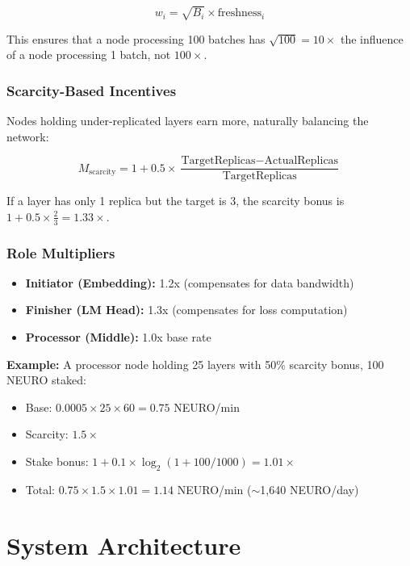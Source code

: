 \documentclass[11pt,a4paper]{article}
\begin{document}
\begin{equation}
w_i = \sqrt{B_i} \times \text{freshness}_i
\end{equation}

This ensures that a node processing 100 batches has $\sqrt{100} = 10\times$ the influence of a node processing 1 batch, not $100\times$.

\subsubsection{Scarcity-Based Incentives}
Nodes holding under-replicated layers earn more, naturally balancing the network:

\begin{equation}
M_{\text{scarcity}} = 1 + 0.5 \times \frac{\text{TargetReplicas} - \text{ActualReplicas}}{\text{TargetReplicas}}
\end{equation}

If a layer has only 1 replica but the target is 3, the scarcity bonus is $1 + 0.5 \times \frac{2}{3} = 1.33\times$.

\subsubsection{Role Multipliers}
\begin{itemize}
    \item \textbf{Initiator (Embedding):} 1.2x (compensates for data bandwidth)
    \item \textbf{Finisher (LM Head):} 1.3x (compensates for loss computation)
    \item \textbf{Processor (Middle):} 1.0x base rate
\end{itemize}

\textbf{Example:} A processor node holding 25 layers with 50\% scarcity bonus, 100 NEURO staked:
\begin{itemize}
    \item Base: $0.0005 \times 25 \times 60 = 0.75$ NEURO/min
    \item Scarcity: $1.5\times$
    \item Stake bonus: $1 + 0.1 \times \log_2(1 + 100/1000) = 1.01\times$
    \item Total: $0.75 \times 1.5 \times 1.01 = 1.14$ NEURO/min ($\sim$1,640 NEURO/day)
\end{itemize}

\section{System Architecture}
\end{document}
